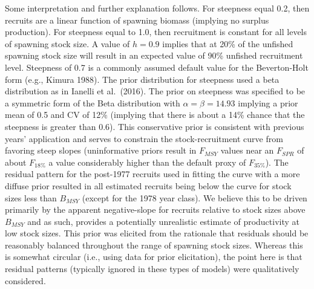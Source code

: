 \documentclass[11pt,
  english,
  a4paper,
]{article}
\begin{document}
Some interpretation and further explanation follows. For steepness equal 0.2, then recruits are a linear function of spawning biomass (implying no surplus production). For steepness equal to 1.0, then recruitment is constant for all levels of spawning stock size. A value of {\(h = 0.9\)\leavevmode\tagmcend\tagstructend} implies that at 20\% of the unfished spawning stock size will result in an expected value of 90\% unfished recruitment level. Steepness of 0.7 is a commonly assumed default value for the Beverton-Holt form (e.g., Kimura 1988). The prior distribution for steepness used a beta distribution as in Ianelli et al.~(2016). The prior on steepness was specified to be a symmetric form of the Beta distribution with {\(\alpha = \beta = 14.93\)\leavevmode\tagmcend\tagstructend} implying a prior mean of 0.5 and CV of 12\% (implying that there is about a 14\% chance that the steepness is greater than 0.6). This conservative prior is consistent with previous years' application and serves to constrain the stock-recruitment curve from favoring steep slopes (uninformative priors result in {\(F_{MSY}\)\leavevmode\tagmcend\tagstructend} values near an {\(F_{SPR}\)\leavevmode\tagmcend\tagstructend} of about {\(F_{18\%}\)\leavevmode\tagmcend\tagstructend} a value considerably higher than the default proxy of {\(F_{35\%}\)\leavevmode\tagmcend\tagstructend}). The residual pattern for the post-1977 recruits used in fitting the curve with a more diffuse prior resulted in all estimated recruits being below the curve for stock sizes less than {\(B_{MSY}\)\leavevmode\tagmcend\tagstructend} (except for the 1978 year class). We believe this to be driven primarily by the apparent negative-slope for recruits relative to stock sizes above {\(B_{MSY}\)\leavevmode\tagmcend\tagstructend} and as such, provides a potentially unrealistic estimate of productivity at low stock sizes. This prior was elicited from the rationale that residuals should be reasonably balanced throughout the range of spawning stock sizes. Whereas this is somewhat circular (i.e., using data for prior elicitation), the point here is that residual patterns (typically ignored in these types of models) were qualitatively considered.
\end{document}
